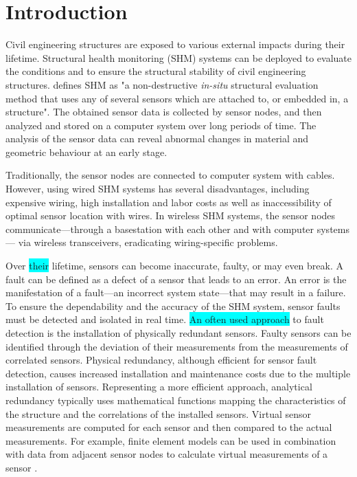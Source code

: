 \documentclass[12pt,a4paper]{scrartcl}
\begin{document}

\section*{Introduction}

Civil engineering structures are exposed to various external impacts during their lifetime. 
Structural health monitoring (SHM) systems can be deployed to evaluate the conditions and to ensure the structural stability of civil engineering structures.
\citet{BisbySHM} defines SHM as "a non-destructive \textit{in-situ} structural evaluation method that uses any of several sensors which are attached to, or embedded in, a structure".
The obtained sensor data is collected by sensor nodes, and then analyzed and stored on a computer system over long periods of time. 
The analysis of the sensor data can reveal abnormal changes in material and geometric behaviour at an early stage.

Traditionally, the sensor nodes are connected to computer system with cables.
However, using wired SHM systems has several disadvantages, including expensive wiring, high installation and labor costs as well as inaccessibility of optimal sensor location with wires.
In wireless SHM systems, the sensor nodes communicate---through a basestation with each other and with computer systems--- via wireless transceivers, eradicating wiring-specific problems.

Over \colorbox{cyan}{their} lifetime, sensors can become inaccurate, faulty, or may even break.
A fault can be defined as a defect of a sensor that leads to an error. An error is the manifestation of a fault---an incorrect system state---that may result in a failure.
To ensure the dependability and the accuracy of the SHM system, sensor faults must be detected and isolated in real time. 
\colorbox{cyan}{An often used approach} to fault detection is the installation of physically redundant sensors.
Faulty sensors can be identified through the deviation of their measurements from the measurements of correlated sensors.
Physical redundancy, although efficient for sensor fault detection, causes increased installation and maintenance costs due to the multiple installation of sensors. 
Representing a more efficient approach, analytical redundancy typically uses mathematical functions mapping the characteristics of the structure and the correlations of the installed sensors. Virtual sensor measurements are computed for each sensor and then compared to the actual measurements. 
For example, finite element models can be used in combination with data from adjacent sensor nodes to calculate virtual measurements of a sensor
\citep{Smarsly2014}.
\end{document}
